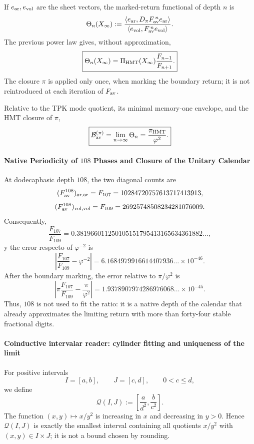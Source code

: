 If \(e_{\rm ar},e_{\rm vol}\) are the sheet vectors, the marked-return
functional of depth \(n\) is
\[
 \Theta_n(X_\infty):=
 \frac{\langle e_{\rm ar},
 D_\pi F_{\rm av}^{\,n}e_{\rm ar}\rangle}
 {\langle e_{\rm vol},
 F_{\rm av}^{\,n}e_{\rm vol}\rangle}.
\]
The previous power law gives, without approximation,
\[
 \boxed{
 \Theta_n(X_\infty)
 =\Pi_{\rm HMT}(X_\infty)\frac{F_{n-1}}{F_{n+1}}.}
\]
The closure \(\pi\) is applied only once, when marking the boundary return; it is not
reintroduced at each iteration of \(F_{\rm av}\).

\begin{corollary}
\label{p12-83-c16-s3:cor:pi-phi2-corta}
Relative to the TPK mode quotient, its minimal memory-one envelope,
and the HMT closure of \(\pi\),
\[
 \boxed{\mathcal B_{\rm av}^{(\pi)}
 =\lim_{n\to\infty}\Theta_n
 =\frac{\pi_{\rm HMT}}{\varphi^2}.}
\]
\end{corollary}

\paragraph{Native Periodicity of \(108\) Phases and Closure of the Unitary Calendar}
At dodecaphasic depth \(108\), the two diagonal counts are
\[
 (F_{\rm av}^{108})_{\rm ar,ar}
 =F_{107}=10284720757613717413913,
\]
\[
 (F_{\rm av}^{108})_{\rm vol,vol}
 =F_{109}=26925748508234281076009.
\]
Consequently,
\[
 \frac{F_{107}}{F_{109}}
 =0.381966011250105151795413165634361882\ldots,
\]
y the error respecto of \(\varphi^{-2}\) is
\[
 \left|\frac{F_{107}}{F_{109}}-\varphi^{-2}\right|
 =6.1684979916614407936\ldots\times10^{-46}.
\]
After the boundary marking, the error relative to
\(\pi/\varphi^2\) is
\[
 \left|\pi\frac{F_{107}}{F_{109}}-\frac{\pi}{\varphi^2}\right|
 =1.9378907974286976068\ldots\times10^{-45}.
\]
Thus, \(108\) is not used to fit the ratio: it is a native depth of
the calendar that already approximates the limiting return with more than
forty-four stable fractional digits.

\paragraph{Coinductive intervalar reader: cylinder fitting and uniqueness of the limit}
For positive intervals
\[
 I=[a,b],\qquad J=[c,d],\qquad 0<c\leq d,
\]
we define
\[
 \mathcal Q(I,J):=
 \left[\frac{a}{d^2},\frac{b}{c^2}\right].
\]
The function \((x,y)\mapsto x/y^2\) is increasing in \(x\) and decreasing in
\(y>0\). Hence \(\mathcal Q(I,J)\) is exactly the smallest interval
containing all quotients \(x/y^2\) with
\((x,y)\in I\times J\); it is not a bound chosen by rounding.


